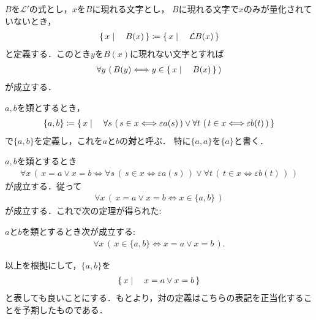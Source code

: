 	$B$を$\mathcal{L}'$の式とし，$x$を$B$に現れる文字とし，
	$B$に現れる文字で$x$のみが量化されていないとき，
	\begin{align}
		\left\{\, x \mid \quad B(x)\, \right\} \coloneqq \left\{\, x \mid \quad \mathcal{L}B(x)\, \right\}
	\end{align}
	と定義する．このとき$y$を$B(x)$に現れない文字とすれば
	\begin{align}
		\forall y\, \left(\, B(y) \Longleftrightarrow y \in \left\{\, x \mid \quad B(x)\, \right\}\, \right)
	\end{align}
	が成立する．
	
	\begin{screen}
		\begin{dfn}[対]
			$a,b$を類とするとき，
			\begin{align}
				\{a,b\} \coloneqq \left\{\, x \mid \quad 
					\forall s\, \left(\, s \in x \Longleftrightarrow \varepsilon a(s)\, \right) \vee 
					\forall t\, \left(\, t \in x \Longleftrightarrow \varepsilon b(t)\, \right)\, \right\}
			\end{align}
			で$\{a,b\}$を定義し，これを$a$と$b$の{\bf 対}と呼ぶ．
			特に$\{a,a\}$を$\{a\}$と書く．
		\end{dfn}
	\end{screen}
	
	$a,b$を類とするとき
	\begin{align}
		\forall x\, \left(\, x = a \vee x = b \Longleftrightarrow 
			\forall s\, \left(\, s \in x \Longleftrightarrow \varepsilon a(s)\, \right) \vee 
			\forall t\, \left(\, t \in x \Longleftrightarrow \varepsilon b(t)\, \right)\, 
		\right)
	\end{align}
	が成立する．従って
	\begin{align}
		\forall x\, (\, x=a \vee x=b \Longleftrightarrow x \in \{a,b\}\, )
		\label{eq:definition_of_a_pair_of_classes}
	\end{align}
	が成立する．これで次の定理が得られた:
	
	
	\begin{screen}
		\begin{thm}[対はそこに書かれている要素しか持たない]
		\label{thm:pair_members_are_exactly_the_given_two}
			$a$と$b$を類とするとき次が成立する:
			\begin{align}
				\forall x\, (\, x \in \{a,b\} \Longleftrightarrow x=a \vee x=b\, ).
			\end{align}
		\end{thm}
	\end{screen}
	
	
	以上を根拠にして，$\{a,b\}$を
	\begin{align}
		\left\{\, x \mid \quad x = a \vee x = b\, \right\}
	\end{align}
	と表しても良いことにする．もとより，対の定義はこちらの表記を正当化することを予期したものである．
	
